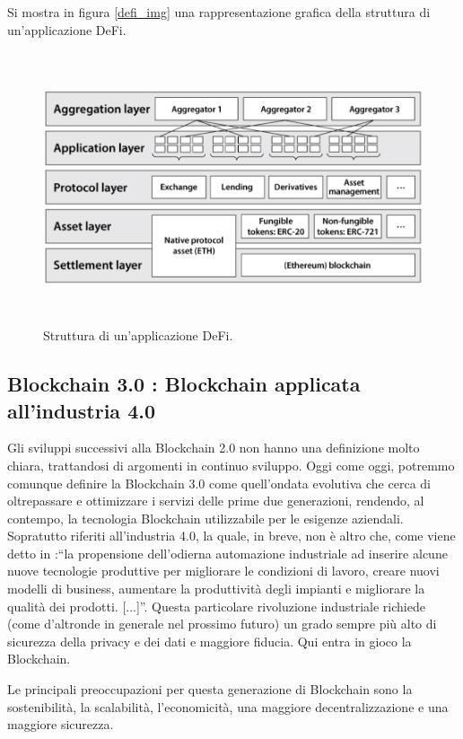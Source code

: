 Si mostra in figura \ref{defi_img} una rappresentazione grafica della struttura di un'applicazione DeFi. 

\begin{figure}[h]
    \centering
    \includegraphics[width=12cm,height=8cm]{Immagini/Defi.png}
    \caption{Struttura di un'applicazione DeFi.}
    \label{defi_img}
    \label{fig:The DeFi Stack}
\end{figure}
\subsection{Blockchain 3.0 : Blockchain applicata all'industria 4.0}\label{Blockchain3.0}
Gli sviluppi successivi alla Blockchain 2.0 non hanno una definizione molto chiara, trattandosi di argomenti in continuo sviluppo.
Oggi come oggi, potremmo comunque definire la Blockchain 3.0 come quell'ondata evolutiva che cerca di oltrepassare e ottimizzare i servizi delle prime due generazioni, rendendo, al contempo, la tecnologia Blockchain utilizzabile per le esigenze aziendali.
Sopratutto riferiti all'industria 4.0, la quale, in breve, non è altro che, come viene detto in \cite{industria4.0}:“la propensione dell'odierna automazione industriale ad inserire alcune nuove tecnologie produttive per migliorare le condizioni di lavoro, creare nuovi modelli di business, aumentare la produttività degli impianti e migliorare la qualità dei prodotti. [...]”.
Questa particolare rivoluzione industriale richiede (come d'altronde in generale nel prossimo futuro) un grado sempre più alto di sicurezza della privacy e dei dati e maggiore fiducia. Qui entra in gioco la Blockchain.

Le principali preoccupazioni per questa generazione di Blockchain sono la sostenibilità, la scalabilità, l'economicità, una maggiore decentralizzazione e una maggiore sicurezza.


